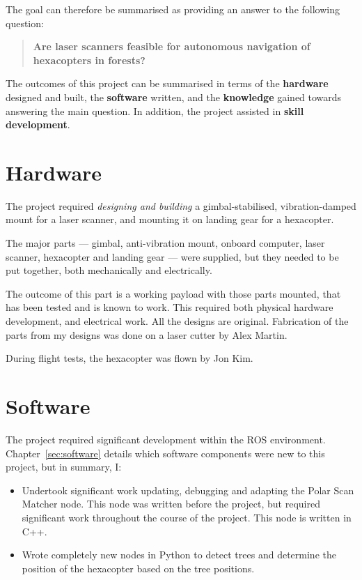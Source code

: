 \documentclass[12pt,oneside,a4paper,draft]{book}
\begin{document}
The goal can therefore be summarised as providing an answer to the
following question:
\begin{quote}
  \textbf{Are laser scanners feasible for autonomous navigation of
    hexacopters in forests?}
\end{quote}

The outcomes of this project can be summarised in terms of the
\textbf{hardware} designed and built, the \textbf{software} written,
and the \textbf{knowledge} gained towards answering the main
question. In addition, the project assisted in \textbf{skill
  development}.

\section{Hardware}
\label{sec:hardware-1}

The project required \emph{designing and building} a
gimbal-stabilised, vibration-damped mount for a laser scanner, and
mounting it on landing gear for a hexacopter.

The major parts --- gimbal, anti-vibration mount, onboard computer, laser
scanner, hexacopter and landing gear --- were supplied, but they needed
to be put together, both mechanically and electrically.

The outcome of this part is a working payload with those parts
mounted, that has been tested and is known to work. This required both
physical hardware development, and electrical work. All the designs
are original. Fabrication of the parts from my designs was done on a
laser cutter by Alex Martin.

During flight tests, the hexacopter was flown by Jon Kim.

\section{Software}
\label{sec:software-1}

The project required significant development within the \gls{ROS}
environment. Chapter~\ref{sec:software} details which software
components were new to this project, but in summary, I:
\begin{itemize}
\item Undertook significant work updating, debugging and adapting the
  Polar Scan Matcher node. This node was written before the project,
  but required significant work throughout the course of the
  project. This node is written in C++.
\item Wrote completely new nodes in Python to detect trees and
  determine the position of the hexacopter based on the tree
  positions.
\end{itemize}
\end{document}
